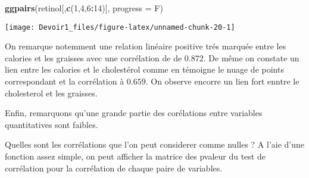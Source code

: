 \documentclass[]{article}
\newenvironment{Shaded}{\begin{snugshade}}{\end{snugshade}}
\newcommand{\KeywordTok}[1]{\textcolor[rgb]{0.13,0.29,0.53}{\textbf{#1}}}
\newcommand{\DataTypeTok}[1]{\textcolor[rgb]{0.13,0.29,0.53}{#1}}
\newcommand{\DecValTok}[1]{\textcolor[rgb]{0.00,0.00,0.81}{#1}}
\newcommand{\StringTok}[1]{\textcolor[rgb]{0.31,0.60,0.02}{#1}}
\newcommand{\CommentTok}[1]{\textcolor[rgb]{0.56,0.35,0.01}{\textit{#1}}}
\newcommand{\OtherTok}[1]{\textcolor[rgb]{0.56,0.35,0.01}{#1}}
\newcommand{\ControlFlowTok}[1]{\textcolor[rgb]{0.13,0.29,0.53}{\textbf{#1}}}
\newcommand{\OperatorTok}[1]{\textcolor[rgb]{0.81,0.36,0.00}{\textbf{#1}}}
\newcommand{\NormalTok}[1]{#1}
\begin{document}
\begin{Shaded}
\begin{Highlighting}[]
\KeywordTok{ggpairs}\NormalTok{(retinol[,}\KeywordTok{c}\NormalTok{(}\DecValTok{1}\NormalTok{,}\DecValTok{4}\NormalTok{,}\DecValTok{6}\OperatorTok{:}\DecValTok{14}\NormalTok{)], }\DataTypeTok{progress =}\NormalTok{ F)}
\end{Highlighting}
\end{Shaded}

\texttt{[image: Devoir1\_files/figure-latex/unnamed-chunk-20-1]}

On remarque notemment une relation linéaire positive trés marquée entre
les calories et les graisses avec une corrélation de de \(0.872\). De
même on constate un lien entre les calories et le cholestérol comme en
témoigne le nuage de points correspondant et la corrélation à \(0.659\).
On observe encorre un lien fort enntre le cholesterol et les graisses.

Enfin, remarquons qu'une grande partie des corélations entre variables
quantitatives sont faibles.

Quelles sont les corrélations que l'on peut considerer comme nulles ? A
l'aie d'une fonction assez simple, on peut afficher la matrice des
pvaleur du test de corrélation pour la corrélation de chaque paire de
variables.

\begin{Shaded}
\end{Shaded}
\end{document}
